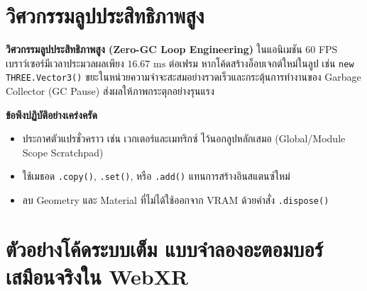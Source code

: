 \section{วิศวกรรมลูปประสิทธิภาพสูง}

\textbf{วิศวกรรมลูปประสิทธิภาพสูง (Zero-GC Loop Engineering)} ในแอนิเมชัน 60 FPS เบราว์เซอร์มีเวลาประมวลผลเพียง $16.67\text{ ms}$ ต่อเฟรม หากโค้ดสร้างอ็อบเจกต์ใหม่ในลูป เช่น \texttt{new THREE.Vector3()} ขยะในหน่วยความจำจะสะสมอย่างรวดเร็วและกระตุ้นการทำงานของ Garbage Collector (GC Pause) ส่งผลให้ภาพกระตุกอย่างรุนแรง

\begin{pitfallbox}
\textbf{ข้อพึงปฏิบัติอย่างเคร่งครัด}
\begin{itemize}
    \item ประกาศตัวแปรชั่วคราว เช่น เวกเตอร์และเมทริกซ์ ไว้นอกลูปหลักเสมอ (Global/Module Scope Scratchpad)
    \item ใช้เมธอด \texttt{.copy()}, \texttt{.set()}, หรือ \texttt{.add()} แทนการสร้างอินสแตนซ์ใหม่
    \item ลบ Geometry และ Material ที่ไม่ได้ใช้ออกจาก VRAM ด้วยคำสั่ง \texttt{.dispose()}
\end{itemize}
\end{pitfallbox}

\section{ตัวอย่างโค้ดระบบเต็ม แบบจำลองอะตอมบอร์เสมือนจริงใน WebXR}

